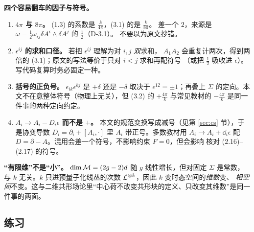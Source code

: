 \begin{keypoint}
\textbf{四个容易翻车的因子与符号。}
\begin{enumerate}[leftmargin=1.6em]
\item \textbf{$4\pi$ 与 $8\pi$。} (1.3) 的系数是 $\frac{k}{4\pi}$，(3.1) 的是 $\frac{k}{8\pi}$。
差一个 $2$，来源是 $\omega=\frac12\omega_{ij}\delta A^i\wedge\delta A^j$ 的 $\frac12$（D-3.1）。
不要以为原文抄错。
\item \textbf{$\epsilon^{ij}$ 的求和口径。} 若把 $\epsilon^{ij}$ 理解为对 $i,j$ \emph{双}求和，
$A_1A_2$ 会重复计两次，得到两倍的 (3.1)；原文的写法等价于只对 $i<j$ 求和再配符号
（或把 $\frac12$ 吸收进 $\epsilon$）。写代码复算时务必固定一种。
\item \textbf{括号的正负号。} $\epsilon_{ik}\epsilon^{kj}$ 是 $+\delta$ 还是 $-\delta$ 取决于
$\epsilon^{12}=\pm1$；再叠上 $\Sigma$ 的定向。本文不在意整体符号（物理上无关），但 (3.2) 的
$+\frac{4\pi}{k}$ 与常见教材的 $-\frac{4\pi}{k}$ 是同一件事的两种定向约定。
\item \textbf{$A_i\to A_i-D_i\epsilon$ 而不是 $+$。} 本文的规范变换写成减号（见第 \ref{sec:cs} 节），于是协变导数 $D_i=\partial_i+[A_i,\cdot]$ 里 $A_i$ 带正号。多数教材用
$A_i\to A_i+\dd_i\epsilon$ 配 $D=\partial-A$。混用会差一个符号，不影响约束 $F=0$，但会影响
核对 (2.16)--(2.17) 的符号。
\end{enumerate}
\end{keypoint}

\begin{keypoint}
\textbf{“有限维”不是“小”。} $\dim\mathcal{M}=(2g-2)d$ 随 $g$ 线性增长，但对固定 $\Sigma$ 是常数，
与 $k$ 无关。$k$ 只进预量子化线丛的次数 $\mathcal{L}^{\otimes k}$，因此 $k$ 变时态空间的\emph{维数}变、
\emph{相空间}不变。这与二维共形场论里“中心荷不改变共形块的定义、只改变其维数”是同一件事的两面。
\end{keypoint}

\subsection{练习}

